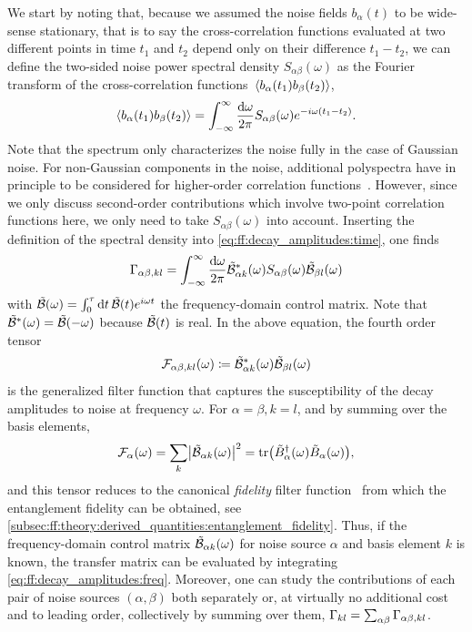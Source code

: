 We start by noting that, because we assumed the noise fields $b_\alpha(t)$ to be wide-sense stationary, that is to say the cross-correlation functions evaluated at two different points in time $t_1$ and $t_2$ depend only on their difference $t_1 - t_2$, we can define the two-sided noise power spectral density $S_{\alpha\beta}(\omega)$ as the Fourier transform of the cross-correlation functions $\expval*{b_\alpha(t_1) b_\beta(t_2)}$,
\begin{equation}\label{eq:ff:spectral_density}
\expval{b_\alpha(t_1) b_{\beta}(t_2)} = \int_{-\infty}^{\infty}\frac{\dd{\omega}}{2\pi} S_{\alpha\beta}(\omega)e^{-i\omega (t_1 - t_2)}.
\end{equation}
Note that the spectrum only characterizes the noise fully in the case of Gaussian noise.
For non-Gaussian components in the noise, additional polyspectra have in principle to be considered for higher-order correlation functions~\cite{Norris2016}.
However, since we only discuss second-order contributions which involve two-point correlation functions here, we only need to take $S_{\alpha\beta}(\omega)$ into account.
Inserting the definition of the spectral density into \cref{eq:ff:decay_amplitudes:time}, one finds
\begin{equation}\label{eq:ff:decay_amplitudes:freq}
\Gamma_{\alpha\beta,kl} = \int_{-\infty}^{\infty}\frac{\dd{\omega}}{2\pi}\tilde{\mathcal{B}}^\ast_{\alpha k}(\omega)S_{\alpha\beta}(\omega)\tilde{\mathcal{B}}_{\beta l}(\omega)
\end{equation}
with $\tilde{\mathcal{B}}(\omega) = \int_0^\tau\dd{t}\tilde{\mathcal{B}}(t)e^{i\omega t}$ the frequency-domain control matrix.
Note that $\tilde{\mathcal{B}}^\ast(\omega) = \tilde{\mathcal{B}}(-\omega)$ because $\tilde{\mathcal{B}}(t)$ is real.
In the above equation, the fourth order tensor
\begin{equation}\label{eq:ff:filter_function:generalized}
\mathcal{F}_{\alpha\beta,kl}(\omega)\coloneqq\tilde{\mathcal{B}}^\ast_{\alpha k}(\omega)\tilde{\mathcal{B}}_{\beta l}(\omega)
\end{equation}
is the generalized filter function that captures the susceptibility of the decay amplitudes to noise at frequency $\omega$.
For $\alpha = \beta, k = l$, and by summing over the basis elements,
\begin{equation}\label{eq:ff:filter_function:fidelity}
\mathcal{F}_{\alpha}(\omega) = \sum_k\bigl\lvert\tilde{\mathcal{B}}_{\alpha k}(\omega)\bigr\rvert^2 = \tr(\tilde{B}_\alpha^\dagger(\omega)\tilde{B}_\alpha(\omega)),
\end{equation}
and this tensor reduces to the canonical \emph{fidelity} filter function~\cite{Green2012} from which the entanglement fidelity can be obtained, see \cref{subsec:ff:theory:derived_quantities:entanglement_fidelity}.
Thus, if the frequency-domain control matrix $\tilde{\mathcal{B}}_{\alpha k}(\omega)$ for noise source $\alpha$ and basis element $k$ is known, the transfer matrix can be evaluated by integrating \cref{eq:ff:decay_amplitudes:freq}.
Moreover, one can study the contributions of each pair of noise sources $(\alpha, \beta)$ both separately or, at virtually no additional cost and to leading order, collectively by summing over them, $\Gamma_{kl} = \sum_{\alpha\beta}\Gamma_{\alpha\beta,kl}$.

